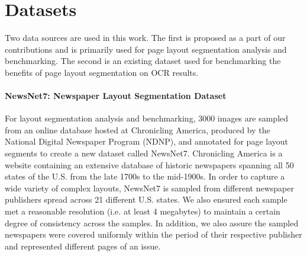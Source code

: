 \documentclass[letterpaper]{article} %
\begin{document}

\section{Datasets}
Two data sources are used in this work. The first is proposed as a part of our contributions and is primarily used for page layout segmentation analysis and benchmarking. The second is an existing dataset used for benchmarking the benefits of page layout segmentation on OCR results.


\paragraph{NewsNet7: Newspaper Layout Segmentation Dataset}
For layout segmentation analysis and benchmarking, 3000 images are sampled from an online database hosted at Chronicling America, produced by the National Digital Newspaper Program (NDNP), and annotated for page layout segments to create a new dataset called NewsNet7. Chronicling America is a website containing an extensive database of historic newspapers spanning all 50 states of the U.S. from the late 1700s to the mid-1900s. In order to capture a wide variety of complex layouts, NewsNet7 is sampled from different newspaper publishers spread across 21 different U.S. states. We also ensured each sample met a reasonable resolution (i.e. at least 4 megabytes) to maintain a certain degree of consistency across the samples. In addition, we also assure the sampled newspapers were covered uniformly within the period of their respective publisher and represented different pages of an issue. 
\end{document}
